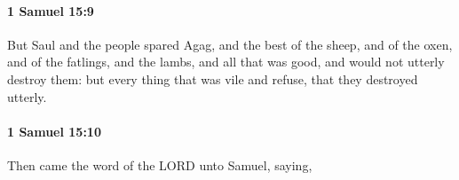 		\paragraph{1 Samuel 15:9} %
			\label{1SAMUEL-15-9}

			But Saul and the people spared Agag, and the best of the sheep, and of the oxen, and of the fatlings, and the lambs, and all that was good, and would not utterly destroy them: but every thing that was vile and refuse, that they destroyed utterly.


		\paragraph{1 Samuel 15:10} %
			\label{1SAMUEL-15-10}

			Then came the word of the LORD unto Samuel, saying,


